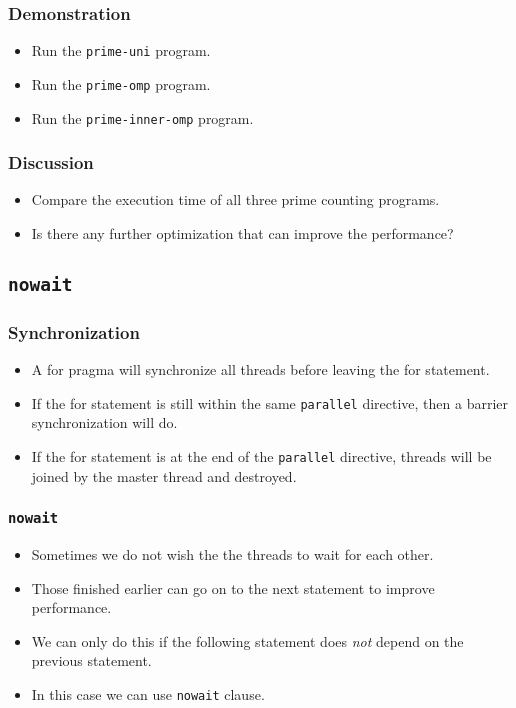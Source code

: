 \documentclass{beamer}
\begin{document}
\begin{frame}
  \frametitle{Demonstration}
  \begin{itemize}
  \item Run the {\tt prime-uni} program.
  \item Run the {\tt prime-omp} program.
  \item Run the {\tt prime-inner-omp} program.
  \end{itemize}
\end{frame}

\begin{frame}
  \frametitle{Discussion}
  \begin{itemize}
  \item Compare the execution time of all three prime counting
    programs.
  \item Is there any further optimization that can improve the
    performance?
  \end{itemize}
\end{frame}

\subsection{\tt nowait}

\begin{frame}
\frametitle{Synchronization}
\begin{itemize}
\item A for pragma will synchronize all threads before leaving the
  for statement.
\item If the for statement is still within the same {\tt parallel}
  directive, then a barrier synchronization will do.
\item If the for statement is at the end of the {\tt parallel}
  directive, threads will be joined by the master thread and
  destroyed.
\end{itemize}
\end{frame}

\begin{frame}
\frametitle{\tt nowait}
\begin{itemize}
\item Sometimes we do not wish the the threads to wait for each other.
\item Those finished earlier can go on to the next statement to improve
  performance.
\item We can only do this if the following statement does {\em not}
  depend on the previous statement.
\item In this case we can use {\tt nowait} clause.
\end{itemize}
\end{frame}
\end{document}

